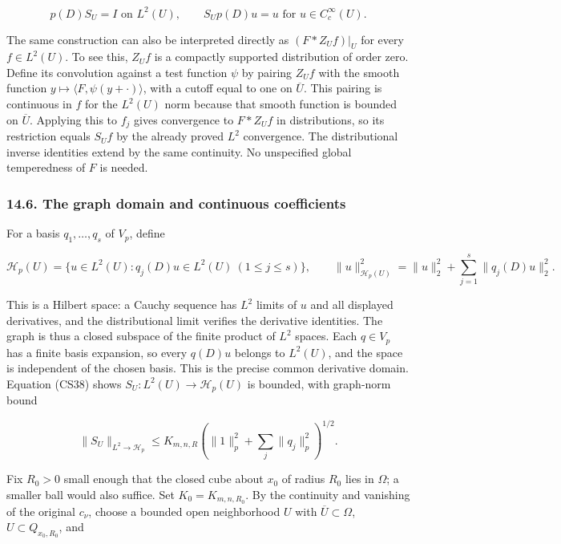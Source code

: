\documentclass[
  11pt,
]{article}
\makeatletter
\let\ReaderOriginalAnchorStart\hyper@anchorstart
\let\ReaderOriginalAnchorEnd\hyper@anchorend
\let\ReaderPendingAliases\@empty
\def\ReaderArmAliases#1{\gdef\ReaderPendingAliases{#1}}
\def\hyper@anchorstart#1{\ReaderIfNativeAnchorTF{#1}{\ReaderPendingAliases\global\let\ReaderPendingAliases\@empty}{}\ReaderOriginalAnchorStart{#1}}
\makeatother
\begin{document}
\[
 p(D)S_U=I\text{ on }L^2(U),\qquad
 S_Up(D)u=u\text{ for }u\in C_c^\infty(U).                   \tag{CS39}
\]

The same construction can also be interpreted directly as
\((F*Z_Uf)|_U\) for every \(f\in L^2(U)\). To see this, \(Z_Uf\) is a
compactly supported distribution of order zero. Define its convolution
against a test function \(\psi\) by pairing \(Z_Uf\) with the smooth
function \(y\mapsto\langle F,\psi(y+\cdot)\rangle\), with a cutoff equal
to one on \(\overline U\). This pairing is continuous in \(f\) for the
\(L^2(U)\) norm because that smooth function is bounded on
\(\overline U\). Applying this to \(f_j\) gives convergence to
\(F*Z_Uf\) in distributions, so its restriction equals \(S_Uf\) by the
already proved \(L^2\) convergence. The distributional inverse
identities extend by the same continuity. No unspecified global
temperedness of \(F\) is needed.

\ReaderArmAliases{\ReaderOriginalAnchorStart{the-graph-domain-and-continuous-coefficients}\ReaderOriginalAnchorEnd}
\subsubsection{14.6. The graph domain and continuous
coefficients}\label{the-graph-domain-and-continuous-coefficients}

For a basis \(q_1,\ldots,q_s\) of \(V_p\), define

\[
 \mathcal H_p(U)=\{u\in L^2(U):q_j(D)u\in L^2(U)
                              \ (1\leq j\leq s)\},
 \qquad
 \|u\|_{\mathcal H_p(U)}^2
        =\|u\|_2^2+\sum_{j=1}^s\|q_j(D)u\|_2^2.              \tag{CS40}
\]

This is a Hilbert space: a Cauchy sequence has \(L^2\) limits of \(u\)
and all displayed derivatives, and the distributional limit verifies the
derivative identities. The graph is thus a closed subspace of the finite
product of \(L^2\) spaces. Each \(q\in V_p\) has a finite basis
expansion, so every \(q(D)u\) belongs to \(L^2(U)\), and the space is
independent of the chosen basis. This is the precise common derivative
domain. Equation (CS38) shows \(S_U:L^2(U)\to\mathcal H_p(U)\) is
bounded, with graph-norm bound

\[
 \|S_U\|_{L^2\to\mathcal H_p}
 \leq K_{m,n,R}\left(\|1\|_p^2+\sum_j\|q_j\|_p^2\right)^{1/2}.
                                                                    \tag{CS41}
\]

Fix \(R_0>0\) small enough that the closed cube about \(x_0\) of radius
\(R_0\) lies in \(\Omega\); a smaller ball would also suffice. Set
\(K_0=K_{m,n,R_0}\). By the continuity and vanishing of the original
\(c_\nu\), choose a bounded open neighborhood \(U\) with
\(\overline U\subset\Omega\), \(U\subset Q_{x_0,R_0}\), and
\end{document}
